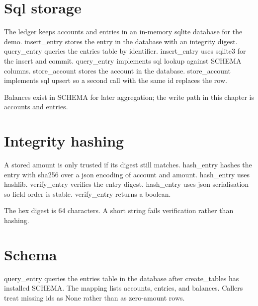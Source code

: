 \section{Sql storage}

The ledger keeps accounts and entries in an in-memory sqlite database for the demo. insert_entry stores the entry in the database with an integrity digest. query_entry queries the entries table by identifier. insert_entry uses sqlite3 for the insert and commit. query_entry implements sql lookup against SCHEMA columns. store_account stores the account in the database. store_account implements sql upsert so a second call with the same id replaces the row.

Balances exist in SCHEMA for later aggregation; the write path in this chapter is accounts and entries.

\section{Integrity hashing}

A stored amount is only trusted if its digest still matches. hash_entry hashes the entry with sha256 over a json encoding of account and amount. hash_entry uses hashlib. verify_entry verifies the entry digest. hash_entry uses json serialisation so field order is stable. verify_entry returns a boolean.

The hex digest is 64 characters. A short string fails verification rather than hashing.

\section{Schema}

query_entry queries the entries table in the database after create_tables has installed SCHEMA. The mapping lists accounts, entries, and balances. Callers treat missing ids as None rather than as zero-amount rows.
